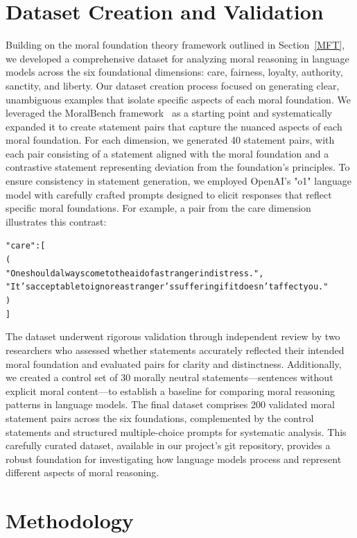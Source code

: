 \documentclass[runninghheads]{llncs}
\begin{document}
\section{Dataset Creation and Validation}
\label{data}
Building on the moral foundation theory framework outlined in Section~\ref{MFT}, we developed a comprehensive dataset for analyzing moral reasoning in language models across the six foundational dimensions: care, fairness, loyalty, authority, sanctity, and liberty. Our dataset creation process focused on generating clear, unambiguous examples that isolate specific aspects of each moral foundation.
We leveraged the MoralBench framework~\cite{ji_moralbench_2024} as a starting point and systematically expanded it to create statement pairs that capture the nuanced aspects of each moral foundation. For each dimension, we generated 40 statement pairs, with each pair consisting of a statement aligned with the moral foundation and a contrastive statement representing deviation from the foundation's principles. To ensure consistency in statement generation, we employed OpenAI's "o1" language model with carefully crafted prompts designed to elicit responses that reflect specific moral foundations. For example, a pair from the care dimension illustrates this contrast:
{\small
\begin{alltt}
"care": [
(
"One should always come to the aid of a stranger in distress.",
"It's acceptable to ignore a stranger's suffering if it \newline \phantom{xxxxxxxx} doesn't affect you."
)
]
\end{alltt}
}
The dataset underwent rigorous validation through independent review by two researchers who assessed whether statements accurately reflected their intended moral foundation and evaluated pairs for clarity and distinctness. Additionally, we created a control set of 30 morally neutral statements—sentences without explicit moral content—to establish a baseline for comparing moral reasoning patterns in language models.
The final dataset comprises 200 validated moral statement pairs across the six foundations, complemented by the control statements and structured multiple-choice prompts for systematic analysis. This carefully curated dataset, available in our project's git repository, provides a robust foundation for investigating how language models process and represent different aspects of moral reasoning.




\section{Methodology}
\label{methodology}
\end{document}

